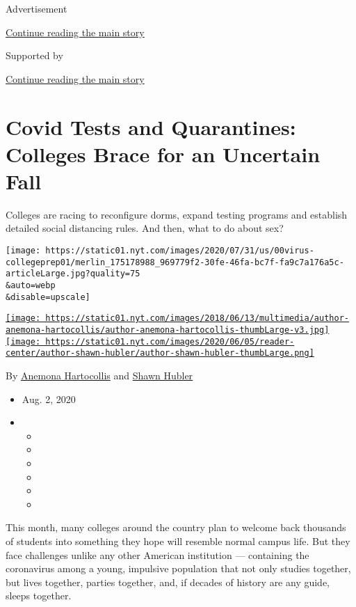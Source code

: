Advertisement

\protect\hyperlink{after-top}{Continue reading the main story}

Supported by

\protect\hyperlink{after-sponsor}{Continue reading the main story}

\hypertarget{covid-tests-and-quarantines-colleges-brace-for-an-uncertain-fall}{%
\section{Covid Tests and Quarantines: Colleges Brace for an Uncertain
Fall}\label{covid-tests-and-quarantines-colleges-brace-for-an-uncertain-fall}}

Colleges are racing to reconfigure dorms, expand testing programs and
establish detailed social distancing rules. And then, what to do about
sex?

\texttt{[image: https://static01.nyt.com/images/2020/07/31/us/00virus-collegeprep01/merlin\_175178988\_969779f2-30fe-46fa-bc7f-fa9c7a176a5c-articleLarge.jpg?quality=75\\\&auto=webp\\\&disable=upscale]}

\href{https://www.nytimes.com/by/anemona-hartocollis}{\texttt{[image: https://static01.nyt.com/images/2018/06/13/multimedia/author-anemona-hartocollis/author-anemona-hartocollis-thumbLarge-v3.jpg]}}\href{https://www.nytimes.com/by/shawn-hubler}{\texttt{[image: https://static01.nyt.com/images/2020/06/05/reader-center/author-shawn-hubler/author-shawn-hubler-thumbLarge.png]}}

By \href{https://www.nytimes.com/by/anemona-hartocollis}{Anemona
Hartocollis} and \href{https://www.nytimes.com/by/shawn-hubler}{Shawn
Hubler}

\begin{itemize}
\item
  Aug. 2, 2020
\item
  \begin{itemize}
  \item
  \item
  \item
  \item
  \item
  \item
  \end{itemize}
\end{itemize}

This month, many colleges around the country plan to welcome back
thousands of students into something they hope will resemble normal
campus life. But they face challenges unlike any other American
institution --- containing the coronavirus among a young, impulsive
population that not only studies together, but lives together, parties
together, and, if decades of history are any guide, sleeps together.


